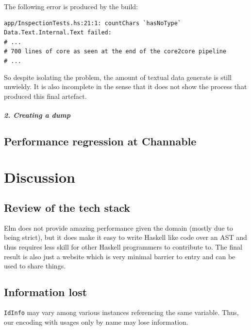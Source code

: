 \documentclass{report}
\newcommand{\mono}{\texttt}
\begin{document}
The following error is produced by the build:

\begin{verbatim}
app/InspectionTests.hs:21:1: countChars `hasNoType` Data.Text.Internal.Text failed:
# ...
# 700 lines of core as seen at the end of the core2core pipeline
# ...
\end{verbatim}

So despite isolating the problem, the amount of textual data generate is still unwieldy.
It is also incomplete in the sense that it does not show the process that produced this final
artefact.

\paragraph{2. Creating a dump}




\section{Performance regression at Channable}

%


\chapter{Discussion}

\section{Review of the tech stack}
Elm does not provide amazing performance given the domain (mostly due to being strict),
but it does make it easy to write Haskell like code over an AST and thus requires less skill
for other Haskell programmers to contribute to. The final result is also just a website which is
very minimal barrier to entry and can be used to share things.

\section{Information lost}
\mono{IdInfo} may vary among various instances referencing the same variable. Thus, our encoding with
usages only by name may lose information.
\end{document}
